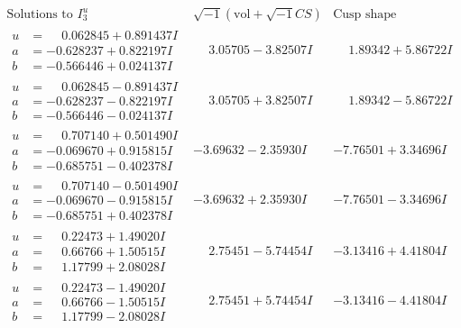 \documentclass[1p]{elsarticle_modified}
\theoremstyle{definition}
\newcommand{\I}{\sqrt{-1}}
\begin{document}
$$\begin{array}{c|c|c}  
\text{Solutions to }I^u_{3}& \I (\text{vol} + \sqrt{-1}CS) & \text{Cusp shape}\\
 \hline 
\begin{aligned}
u &= \phantom{-}0.062845 + 0.891437 I \\
a &= -0.628237 + 0.822197 I \\
b &= -0.566446 + 0.024137 I\end{aligned}
 & \phantom{-}3.05705 - 3.82507 I & \phantom{-}1.89342 + 5.86722 I \\ \hline\begin{aligned}
u &= \phantom{-}0.062845 - 0.891437 I \\
a &= -0.628237 - 0.822197 I \\
b &= -0.566446 - 0.024137 I\end{aligned}
 & \phantom{-}3.05705 + 3.82507 I & \phantom{-}1.89342 - 5.86722 I \\ \hline\begin{aligned}
u &= \phantom{-}0.707140 + 0.501490 I \\
a &= -0.069670 + 0.915815 I \\
b &= -0.685751 - 0.402378 I\end{aligned}
 & -3.69632 - 2.35930 I & -7.76501 + 3.34696 I \\ \hline\begin{aligned}
u &= \phantom{-}0.707140 - 0.501490 I \\
a &= -0.069670 - 0.915815 I \\
b &= -0.685751 + 0.402378 I\end{aligned}
 & -3.69632 + 2.35930 I & -7.76501 - 3.34696 I \\ \hline\begin{aligned}
u &= \phantom{-}0.22473 + 1.49020 I \\
a &= \phantom{-}0.66766 + 1.50515 I \\
b &= \phantom{-}1.17799 + 2.08028 I\end{aligned}
 & \phantom{-}2.75451 - 5.74454 I & -3.13416 + 4.41804 I \\ \hline\begin{aligned}
u &= \phantom{-}0.22473 - 1.49020 I \\
a &= \phantom{-}0.66766 - 1.50515 I \\
b &= \phantom{-}1.17799 - 2.08028 I\end{aligned}
 & \phantom{-}2.75451 + 5.74454 I & -3.13416 - 4.41804 I \\ \hline\begin{aligned}

\end{aligned}
\end{array}$$
\end{document}
